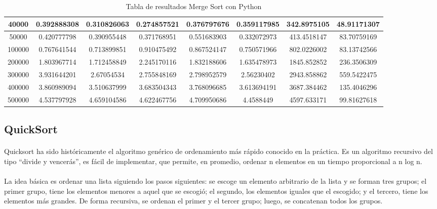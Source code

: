 \documentclass{article}
\begin{document}
\begin{table}[]
\begin{tabular}{|c|c|c|c|c|c|c|c| }
                40000 &	0.392888308 &	0.310826063 &	0.274857521 &	0.376797676 &	0.359117985	 &342.8975105	 &48.91171307\\ \hline
                50000 &	0.420777798 &	0.390955448 &	0.371768951 &	0.551683903 &	0.332072973	 &413.4518147	 &83.70759169\\ \hline
                100000 &	0.767641544	 &0.713899851 &	0.910475492 &	0.867524147 &	0.750571966 &	802.0226002	 &83.13742566\\ \hline
                200000 &	1.803967714 &	1.712458849 &	2.245170116 &	1.832188606 &	1.635478973	 &1845.852852 &	236.3506309\\ \hline
                300000 &	3.931644201 &	2.67054534 &	2.755848169 &	2.798952579 &	2.56230402	 &2943.858862	 &559.5422475\\ \hline
                400000 &	3.860989094 &	3.510637999 &	3.683504343 &	3.768096685 &	3.613694191	 &3687.384462	 &135.4046296\\ \hline
                500000 &	4.537797928 &	4.659104586 &	4.622467756 &	4.709950686 &	4.4588449	 &4597.633171 &99.81627618\\ \hline
            \end{tabular}
               \caption{Tabla de resultados Merge Sort con Python}
        \label{tab:mergeSortPython}
    \end{table}
    \subsection{QuickSort}
        \paragraph {}
        Quicksort ha sido históricamente el algoritmo genérico de ordenamiento más rápido conocido en la práctica. Es un algoritmo recursivo del tipo “divide y vencerás”, es fácil de implementar, que permite, en promedio, ordenar n elementos en un tiempo proporcional a n log n.
        \paragraph {}
        La idea básica es ordenar una lista siguiendo los pasos siguientes: se escoge un elemento arbitrario de la lista y se forman tres grupos; el primer grupo, tiene los elementos menores a aquel que se escogió; el segundo, los elementos iguales que el escogido; y el tercero, tiene los elementos más grandes. De forma recursiva, se ordenan el primer y el tercer grupo; luego, se concatenan todos los grupos.
\end{document}
